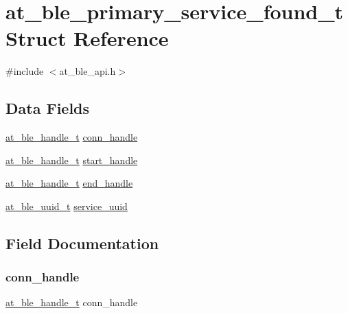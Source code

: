 \hypertarget{structat__ble__primary__service__found__t}{}\section{at\+\_\+ble\+\_\+primary\+\_\+service\+\_\+found\+\_\+t Struct Reference}
\label{structat__ble__primary__service__found__t}


{\ttfamily \#include $<$at\+\_\+ble\+\_\+api.\+h$>$}

\subsection*{Data Fields}
\begin{DoxyCompactItemize}
\item 
\mbox{\hyperlink{at__ble__api_8h_abd23646d0c662860741f787efc8456f2}{at\+\_\+ble\+\_\+handle\+\_\+t}} \mbox{\hyperlink{structat__ble__primary__service__found__t_ae42df6fd8493f8f8faeccfdd6062e96f}{conn\+\_\+handle}}
\item 
\mbox{\hyperlink{at__ble__api_8h_abd23646d0c662860741f787efc8456f2}{at\+\_\+ble\+\_\+handle\+\_\+t}} \mbox{\hyperlink{structat__ble__primary__service__found__t_ac7742bb811cf20fa3215e3d2129b6b26}{start\+\_\+handle}}
\item 
\mbox{\hyperlink{at__ble__api_8h_abd23646d0c662860741f787efc8456f2}{at\+\_\+ble\+\_\+handle\+\_\+t}} \mbox{\hyperlink{structat__ble__primary__service__found__t_a6ba46ffbef9b8627bb3f869145e8d37a}{end\+\_\+handle}}
\item 
\mbox{\hyperlink{structat__ble__uuid__t}{at\+\_\+ble\+\_\+uuid\+\_\+t}} \mbox{\hyperlink{structat__ble__primary__service__found__t_a87ec4f9ef72befe1558faedefc80b7d7}{service\+\_\+uuid}}
\end{DoxyCompactItemize}


\subsection{Field Documentation}
\mbox{\label{structat__ble__primary__service__found__t_ae42df6fd8493f8f8faeccfdd6062e96f}} 
\subsubsection{\texorpdfstring{conn\_handle}{conn\_handle}}
{\footnotesize\ttfamily \mbox{\hyperlink{at__ble__api_8h_abd23646d0c662860741f787efc8456f2}{at\+\_\+ble\+\_\+handle\+\_\+t}} conn\+\_\+handle}

